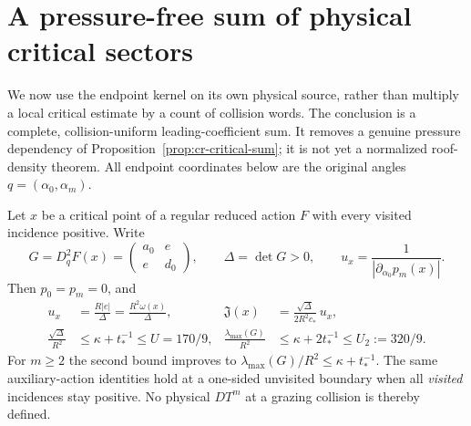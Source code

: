 \section{A pressure-free sum of physical critical sectors}
\label{sec:mc-critical}
We now use the endpoint kernel on its own physical source, rather than
multiply a local critical estimate by a count of collision words. The
conclusion is a complete, collision-uniform leading-coefficient sum.
It removes a genuine pressure dependency of
Proposition~\ref{prop:cr-critical-sum}; it is not yet a normalized
roof-density theorem. All endpoint coordinates below are the original
angles $q=(\alpha_0,\alpha_m)$.

\begin{lemma}
\label{lem:mc-hessian}
Let $x$ be a critical point of a regular reduced action $F$ with every
visited incidence positive. Write
\[
 G=D_q^2F(x)=\begin{pmatrix}a_0&e\\e&d_0\end{pmatrix},
 \qquad \Delta=\det G>0,\qquad
 u_x=\frac1{|\partial_{\alpha_0}p_m(x)|}.
\]
Then $p_0=p_m=0$, and
\begin{align}
 u_x&=\frac{R|e|}{\Delta}=\frac{R^2\omega(x)}{\Delta},
   &\mathfrak J(x)&=\frac{\sqrt\Delta}{2R^2c_*}\,u_x,
                                                    \label{eq:mc-weight}\\
 \frac{\sqrt\Delta}{R^2}&\le\kappa+t_*^{-1}\le U=170/9,
   &\frac{\lambda_{\max}(G)}{R^2}
       &\le\kappa+2t_*^{-1}\le U_2:=320/9.\label{eq:mc-Hbounds}
\end{align}
For $m\ge2$ the second bound improves to
$\lambda_{\max}(G)/R^2\le\kappa+t_*^{-1}$.
The same auxiliary-action identities hold at a one-sided unvisited
boundary when all \emph{visited} incidences stay positive. No physical
$DT^m$ at a grazing collision is thereby defined.
\end{lemma}
